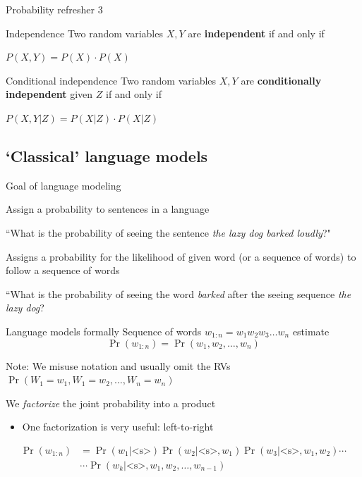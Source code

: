 \documentclass[12pt,aspectratio=169,handout]{beamer}
\begin{document}
\begin{frame}{Probability refresher 3}
	
	\begin{block}{Independence}
		Two random variables $X, Y$ are \textbf{independent} if and only if
		
		$P(X, Y) = P(X) \cdot P(X)$
	\end{block}
	
	\pause
	
	\begin{block}{Conditional independence}
		Two random variables $X, Y$ are \textbf{conditionally independent} given $Z$ if and only if
		
		$P(X, Y | Z) = P(X|Z) \cdot P(X|Z)$
	\end{block}
	
\end{frame}


\subsection{`Classical' language models}

\begin{frame}{Goal of language modeling}
	
	Assign a probability to sentences in a language
	
	\begin{example}
		``What is the probability of seeing the sentence \emph{the lazy dog barked loudly}?"
	\end{example}
	
	Assigns a probability for the likelihood of given word (or a sequence of words) to follow a sequence of words
	
	\begin{example}
		``What is the probability of seeing the word \emph{barked} after the seeing sequence \emph{the lazy dog}?
	\end{example}
	
\end{frame}

\begin{frame}{Language models formally}
	Sequence of words $w_{1:n} = w_1 w_2 w_3 \ldots w_n$ estimate
	$$
	\Pr(w_{1:n}) = \Pr(w_1, w_2, \ldots, w_n)
	$$
	\begin{block}{Note: We misuse notation and usually omit the RVs}
		$\Pr(W_1 = w_1, W_1 = w_2, \ldots, W_n = w_n)$
	\end{block}
	
	We \emph{factorize} the joint probability into a product
	\begin{itemize}
		\item One factorization is very useful: left-to-right
	\end{itemize}
	$$
	\begin{aligned}
	\Pr(w_{1:n}) &= \Pr(w_1 | \text{<s>}) \Pr (w_2 | \text{<s>}, w_1) \Pr(w_3 | \text{<s>}, w_1, w_2) \cdots\\
	&\cdots \Pr(w_k | \text{<s>}, w_1, w_2, \ldots, w_{n-1})
	\end{aligned}
	$$
	
\end{frame}
\end{document}
